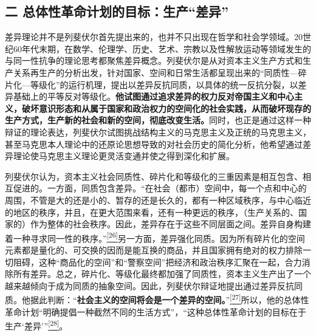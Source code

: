 \documentclass[UTF8, fontset = sourcesans, a4paper, oneside, zihao =
-4, scheme=chinese, no-math, space=true]{ctexbook}
\begin{document}
\subsection{\texorpdfstring{二
总体性革命计划的目标：生产``差异''}{二 总体性革命计划的目标：生产差异}}\label{part0008_split_002.htmlux5cux23c040}

差异理论并不是列斐伏尔首先提出来的，也并不只出现在哲学和社会学领域。20世纪60年代末期，在数学、伦理学、历史、艺术、宗教以及性解放运动等领域发生的与同一性抗争的理论思考都聚焦差异概念。列斐伏尔是从对资本主义生产方式和生产关系再生产的分析出发，针对国家、空间和日常生活都呈现出来的``同质性---碎片化---等级化''的运行机理，提出以差异反抗同质，以具体的统一反抗分裂，以差异基础上的平等反对等级化。\textbf{他试图通过追求差异的权力反对帝国主义和中心主义，破坏意识形态和从属于国家和政治权力的空间化的社会实践，从而破坏现存的生产方式，生产新的社会和新的空间，彻底改变生活。}同时，也正是通过这样一种辩证的理论表达，列斐伏尔试图挑战结构主义的马克思主义及正统的马克思主义，甚至马克思本人理论中的还原论思想导致的对社会历史的简化分析，他希望通过差异理论使马克思主义理论更灵活变通并使之得到深化和扩展。

列斐伏尔认为，资本主义社会同质性、碎片化和等级化的三重因素是相互包含、相互促进的。一方面，同质包含差异。``在社会（都市）空间中，每一个点和中心的周围，不管是大的还是小的、暂存的还是长久的，都有一种区域秩序，与中心临近的地区的秩序，并且，在更大范围来看，还有一种更远的秩序，（生产关系的、国家的）作为整体的社会秩序。因此，差异存在于这些不同层面之间。差异自身构建着一种寻求同一性的秩序。''\protect\hypertarget{part0008_split_002.htmlux5cux23w26}{}{}\protect\hyperlink{part0008_split_003.htmlux5cux23m26}{\textsuperscript{{[}26{]}}}另一方面，差异强化同质。因为所有碎片化的空间元素都是量化的、可交换的因而是能互换的商品，并且国家拥有绝对的权力排除一切阻碍，这种``商品化的空间''和``警察空间''把经济和政治秩序汇聚在一起，合力消除所有差异。总之，碎片化、等级化最终都加强了同质性，资本主义生产出了一个越来越倾向于成为同质的抽象空间。因此，列斐伏尔辩证地提出通过差异反抗同质。他据此判断：``\textbf{社会主义的空间将会是一个差异的空间。}''\protect\hypertarget{part0008_split_002.htmlux5cux23w27}{}{}\protect\hyperlink{part0008_split_003.htmlux5cux23m27}{\textsuperscript{{[}27{]}}}所以，他的总体性革命计划``明确提倡一种截然不同的生活方式''，``这种总体性革命计划的目标在于生产`差异'''\protect\hypertarget{part0008_split_002.htmlux5cux23w28}{}{}\protect\hyperlink{part0008_split_003.htmlux5cux23m28}{\textsuperscript{{[}28{]}}}。
\end{document}
